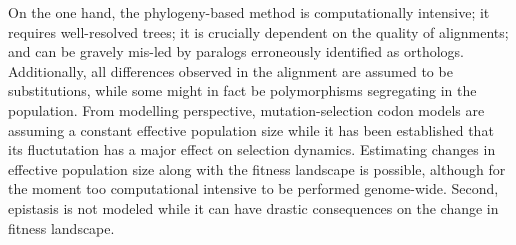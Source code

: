 \documentclass{article}
\begin{document}
    On the one hand, the phylogeny-based method is computationally intensive; it requires well-resolved trees; it is crucially dependent on the quality of alignments; and can be gravely mis-led by paralogs erroneously identified as orthologs.
    Additionally, all differences observed in the alignment are assumed to be substitutions, while some might in fact be polymorphisms segregating in the population\cite{mugal_why_2014}.
    From modelling perspective, mutation-selection codon models are assuming a constant effective population size while it has been established that its fluctutation has a major effect on selection dynamics\cite{lanfear_population_2014, platt_protein_2018}.
    Estimating changes in effective population size along with the fitness landscape is possible\cite{latrille_inferring_2021}, although for the moment too computational intensive to be performed genome-wide.
    Second, epistasis is not modeled while it can have drastic consequences on the change in fitness landscape\cite{pollock_strong_2014, latrille_quantifying_2021}.
\end{document}
